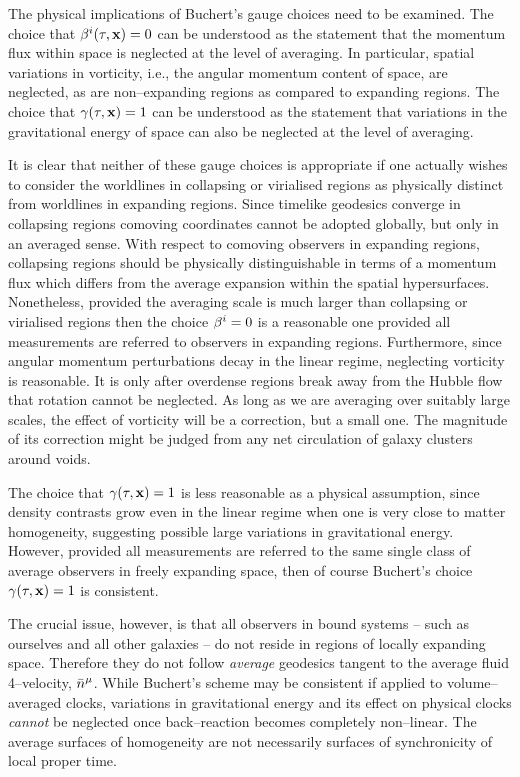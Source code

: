 \documentclass[12pt]{article}
\begin{document}
The physical implications of Buchert's gauge choices need to be examined.
The choice that $\beta^i(\tau,{\mathbf x})=0$ can be understood as the statement that
the momentum flux within space is neglected at the level of averaging.
In particular, spatial variations in vorticity, i.e., the angular momentum
content of space, are neglected, as are non--expanding regions as compared to
expanding regions. The choice that $\gamma(\tau,{\mathbf x})=1$ can be understood as
the statement that variations in the gravitational energy of space can
also be neglected at the level of averaging.

It is clear that neither of these gauge choices is appropriate if one actually
wishes to consider the worldlines in collapsing or virialised regions as
physically distinct from worldlines in expanding regions. Since timelike
geodesics converge in collapsing regions comoving coordinates cannot be
adopted globally, but only in an averaged sense. With respect
to comoving observers in expanding regions, collapsing regions should
be physically distinguishable in terms of a momentum flux which differs
from the average expansion within the
spatial hypersurfaces. Nonetheless, provided the averaging scale is
much larger than collapsing or virialised regions then the choice $\beta^i=0$ is
a reasonable one provided all measurements are referred to observers
in expanding regions. Furthermore, since angular momentum perturbations decay
in the linear regime, neglecting vorticity is reasonable. It is only
after overdense regions break away from the Hubble flow that rotation cannot
be neglected. As long as we are averaging over suitably large scales, the
effect of vorticity will be a correction, but a small one. The magnitude of
its correction might be judged from any net circulation of galaxy clusters
around voids.

The choice that $\gamma(\tau,{\mathbf x})=1$ is less reasonable as a physical assumption,
since density contrasts grow even in the linear regime when one is very
close to matter homogeneity, suggesting possible large variations in
gravitational energy. However, provided all measurements are referred to the
same single class of average observers in freely expanding space, then of
course Buchert's choice $\gamma(\tau,{\mathbf x})=1$ is consistent.

The crucial issue, however, is that all observers in bound systems --
such as ourselves and all other galaxies -- do not reside in regions of
locally expanding space. Therefore they do not follow {\em average} geodesics
tangent to the average fluid 4--velocity, $\bn^\mu$. While Buchert's scheme
may be consistent if applied to volume--averaged clocks, variations in
gravitational energy and its effect on physical clocks {\em cannot} be
neglected once back--reaction becomes completely non--linear. The average
surfaces of homogeneity are not necessarily surfaces of synchronicity
of local proper time.
\end{document}

